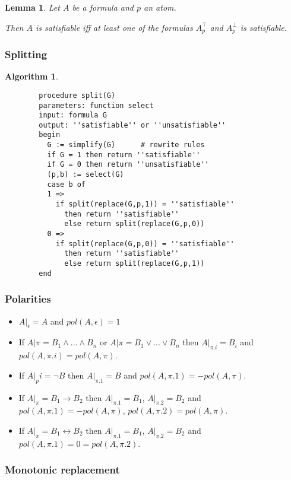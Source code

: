 \documentclass[]{article}
\newtheorem{lemma}{Lemma}
\newtheorem{algorithm}{Algorithm}
\begin{document}
\begin{lemma}
	Let $A$ be a formula and $p$ an atom.
	
	Then $A$ is satisfiable iff at least one of the formulas $A_p^\top$ and $A_p^\bot$ is satisfiable.
\end{lemma}

\subsubsection{Splitting}

\begin{algorithm}
	\begin{verbatim}
		procedure split(G)
		parameters: function select
		input: formula G
		output: ''satisfiable'' or ''unsatisfiable''
		begin
		  G := simplify(G)		# rewrite rules
		  if G = 1 then return ''satisfiable''
		  if G = 0 then return ''unsatisfiable''
		  (p,b) := select(G)
		  case b of
		  1 =>
		    if split(replace(G,p,1)) = ''satisfiable''
		      then return ''satisfiable''
		      else return split(replace(G,p,0))
		  0 =>
		    if split(replace(G,p,0)) = ''satisfiable''
		      then return ''satisfiable''
		      else return split(replace(G,p,1))
		end
	\end{verbatim}
\end{algorithm}

\subsubsection{Polarities}
\begin{itemize}
	\item $A|_\epsilon = A$ and $pol(A,\epsilon) = 1$
	\item If $A|\pi = B_1 \land ... \land B_n$ or $A|\pi = B_1 \lor ... \lor B_n$ then $A|_{\pi.i} = B_i$ and $pol(A,\pi.i) = pol(A,\pi)$.
	\item If $A|_pi = \lnot B$ then $A|_{\pi.1} = B$ and $pol(A,\pi.1) = -pol(A,\pi)$.
	\item If $A|_\pi = B_1 \rightarrow B_2$ then $A|_{\pi.1} = B_1$, $A|_{\pi.2} = B_2$ and $pol(A,\pi.1) = -pol(A,\pi)$, $pol(A,\pi.2) = pol(A,\pi)$.
	\item If $A|_\pi = B_1 \leftrightarrow B_2$ then $A|_{\pi.1} = B_1$, $A|_{\pi.2} = B_2$ and $pol(A,\pi.1) = 0 = pol(A,\pi.2)$.
\end{itemize}

\subsubsection{Monotonic replacement}
\end{document}
